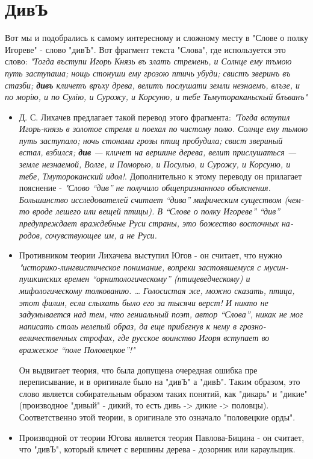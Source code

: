 \documentclass[14pt, a4paper]{article}
\begin{document}
{\section{ДивЪ}
Вот мы и подобрались к самому интересному и сложному месту в "Слове о полку Игореве" - слово "дивЪ". Вот фрагмент текста "Слова", где используется это слово: {\itshape "Тогда въступи Игорь Князь въ златъ стремень, и Солнце ему тъмою путь заступаша; нощь стонуши ему грозою птичь убуди; свистъ зверинъ въ стазби; {\bfseries дивъ} кличетъ връху древа, велитъ послушати земли незнаемъ, влъзе, и по морію, и по Сулію, и Сурожу, и Корсуню, и тебе Тьмутораканьскый блъванъ"}
\begin{itemize}
  \item Д. С. Лихачев предлагает такой перевод этого фрагмента: {\itshape "Тогда вступил Игорь-князь в золотое стре­мя и поехал по чистому полю. Солнце ему тьмою путь засту­пало; ночь стонами грозы птиц пробудила; свист звериный встал, взбился; {\bfseries див} — кличет на вершине дерева, велит прислушаться — земле незнаемой, Волге, и Поморью, и Посулью, и Сурожу, и Корсуню, и тебе, Тмутороканский идол!}. Дополнительно к этому переводу он прилагает пояснение - {\itshape "Слово “див” не получило обще­признанного объяснения. Большинство исследователей счита­ет “дива” мифическим существом (чем-то вроде лешего или вещей птицы). В “Слове о полку Игореве” “див” предупреждает враждебные Руси страны, это божество восточных на­родов, сочувствующее им, а не Руси.}
  \item Противником теории Лихачева выступил Югов - он считает, что нужно {\itshape "историко-лингвистическое понимание, вопреки застоявшемуся с мусин-пушкинских времен “орнитологическому” (птицеведческому) и мифологическому толкованию. … Голосистая же, можно сказать, птица, этот филин, если слыхать было его за тысячи верст! И никто не задумывается над тем, что гениальный поэт, автор “Слова”, никак не мог написать столь нелепый образ, да еще прибегнув к нему в грозно-величественных строфах, где русское воинство Игоря вступает во вражеское “поле Поло­вецкое”!"}
  \par Он выдвигает теория, что была допущена очередная ошибка пре переписывание, и в оригинале было на "дивЪ" а "дивЬ". Таким образом, это слово является собирательным образом таких понятий, как "дикарь" и "дикие" (производное "дивый" - дикий, то есть дивь -> дикие -> половцы). Соответственно этой теории, в оригинале это означало "половецкие орды".
  \item Производной от теории Югова является теория Павлова-Бицина - он считает, что "дивЪ", который кличет с вершины дерева - дозорник или караульщик.

\end{itemize}}
\end{document}
